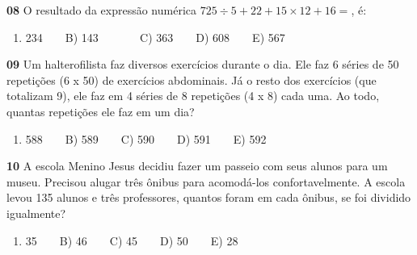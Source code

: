 \documentclass[
  12pt,
]{article}
\providecommand{\tightlist}{%
  \setlength{\itemsep}{0pt}\setlength{\parskip}{0pt}}
\begin{document}
\vspace{0.8cm}

\textbf{08} O resultado da expressão numérica
\(725 \div 5 + 22 + 15 \times 12 + 16=\), é:

\begin{enumerate}
\def\labelenumi{\Alph{enumi})}
\tightlist
\item
  234 ~ ~ B) 143 ~ ~ ~ ~ C) 363 ~ ~ D) 608 ~ ~ E) 567
\end{enumerate}

\textbf{09} Um halterofilista faz diversos exercícios durante o dia. Ele
faz 6 séries de 50 repetições (6 x 50) de exercícios abdominais. Já o
resto dos exercícios (que totalizam 9), ele faz em 4 séries de 8
repetições (4 x 8) cada uma. Ao todo, quantas repetições ele faz em um
dia?

\begin{enumerate}
\def\labelenumi{\Alph{enumi})}
\tightlist
\item
  588 ~ ~ B) 589 ~ ~ C) 590 ~ ~ D) 591 ~ ~ E) 592
\end{enumerate}

\textbf{10} A escola Menino Jesus decidiu fazer um passeio com seus
alunos para um museu. Precisou alugar três ônibus para acomodá-los
confortavelmente. A escola levou 135 alunos e três professores, quantos
foram em cada ônibus, se foi dividido igualmente?

\begin{enumerate}
\def\labelenumi{\Alph{enumi})}
\tightlist
\item
  35 ~ ~ B) 46 ~ ~ C) 45 ~ ~ D) 50 ~ ~ E) 28
\end{enumerate}
\end{document}

